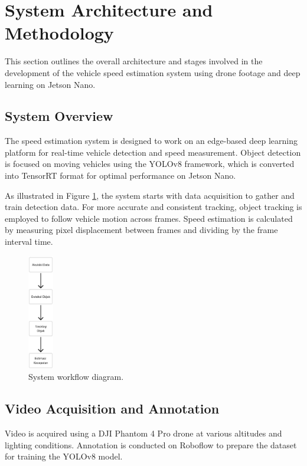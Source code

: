 \section{System Architecture and Methodology}
\label{sec:methodology}

This section outlines the overall architecture and stages involved in the development of the vehicle speed estimation system using drone footage and deep learning on Jetson Nano.

\subsection{System Overview}

The speed estimation system is designed to work on an edge-based deep learning platform for real-time vehicle detection and speed measurement. Object detection is focused on moving vehicles using the YOLOv8 framework, which is converted into TensorRT format for optimal performance on Jetson Nano.

As illustrated in Figure \ref{fig:system-arch}, the system starts with data acquisition to gather and train detection data. For more accurate and consistent tracking, object tracking is employed to follow vehicle motion across frames. Speed estimation is calculated by measuring pixel displacement between frames and dividing by the frame interval time.

\begin{figure}[H]
    \centering
    \includegraphics[width=0.1\textwidth]{gambar/diagramsistem.jpg}
    \caption{System workflow diagram.}
    \label{fig:system-arch}
\end{figure}

\subsection{Video Acquisition and Annotation}

Video is acquired using a DJI Phantom 4 Pro drone at various altitudes and lighting conditions. Annotation is conducted on Roboflow to prepare the dataset for training the YOLOv8 model.

